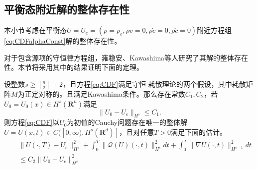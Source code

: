 	
	\subsection{平衡态附近解的整体存在性}
	本小节考虑在平衡态$U=U_e = (\rho = \rho_e, \rho v = 0, \rho \dot{c} = 0, \rho \mathring{c} =0)$附近方程组\eqref{eq:CDFalphaConst}解的整体存在性。  

	对于包含源项的守恒律方程组，雍稳安、Kawashima等人研究了其解的整体存在性\cite{yong2004entropy,kawashima2009decay,kawashima2004dissipative}。本节将采用其中的结果证明下面的定理。
	\begin{theorem} \label{th:Kawashima}
		设整数$s \ge [\frac{n}{2}]+2$，且方程\eqref{eq:CDF}满足守恒-耗散理论的两个假设，其中耗散矩阵$M$为正定对称的。且满足Kawashima条件。那么存在常数$C_1,C_2$，若$U_0 = U_0(x) \in H^s(\mathbf{R}^n)$满足
		\begin{equation*}
			\|U_0 -U_e\|_{H^s} \le C_1.
		\end{equation*}
		则方程\eqref{eq:CDF}以$U_0$为初值的Cauchy问题存在唯一的整体解$U=U(x,t) \in C([0,\infty),H^s(\mathbf{R}^d)]$，且对任意$T>0$满足下面的估计。
		\begin{eqnarray*}
			&& \|U(\cdot,T) - U_e \|_{H^s}^2 + \int_0^T \| \mathcal{Q}(U)(\cdot,t)\|_{H^s}^2 dt + \int_0^T \|\nabla U (\cdot,t)\|_{H^{s-1}}^2 dt \\
			&& \le C_2 \| U_0 -U_e\|_{H^s}^2
		\end{eqnarray*}
	\end{theorem}

